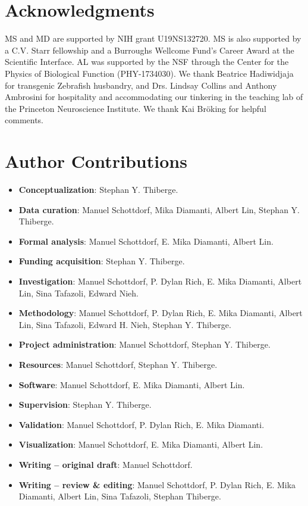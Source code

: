 \documentclass[10pt,letterpaper]{article}
\begin{document}
\section*{Acknowledgments}
MS and MD are supported by NIH grant U19NS132720. MS is also supported by a C.V. Starr fellowship and a Burroughs Wellcome Fund's Career Award at the Scientific Interface. AL was supported by the NSF through the Center for the Physics of Biological Function (PHY-1734030). We thank Beatrice Hadiwidjaja for transgenic Zebrafish husbandry, and Drs. Lindsay Collins and Anthony Ambrosini for hospitality and accommodating our tinkering in the teaching lab of the Princeton Neuroscience Institute. We thank Kai Br\"oking for helpful comments.

\section*{Author Contributions}
\begin{itemize}
    \item \textbf{Conceptualization}: Stephan Y. Thiberge.
    \item \textbf{Data curation}: Manuel Schottdorf, Mika Diamanti, Albert Lin, Stephan Y. Thiberge.
    \item \textbf{Formal analysis}: Manuel Schottdorf, E. Mika Diamanti, Albert Lin.
    \item \textbf{Funding acquisition}: Stephan Y. Thiberge.
    \item \textbf{Investigation}: Manuel Schottdorf, P. Dylan Rich, E. Mika Diamanti, Albert Lin, Sina Tafazoli, Edward Nieh.
    \item \textbf{Methodology}: Manuel Schottdorf, P. Dylan Rich, E. Mika Diamanti, Albert Lin, Sina Tafazoli, Edward H. Nieh, Stephan Y. Thiberge. 
    \item \textbf{Project administration}: Manuel Schottdorf, Stephan Y. Thiberge.
    \item \textbf{Resources}: Manuel Schottdorf, Stephan Y. Thiberge.
    \item \textbf{Software}: Manuel Schottdorf, E. Mika Diamanti, Albert Lin.
    \item \textbf{Supervision}: Stephan Y. Thiberge.
    \item \textbf{Validation}: Manuel Schottdorf, P. Dylan Rich, E. Mika Diamanti.
    \item \textbf{Visualization}: Manuel Schottdorf, E. Mika Diamanti, Albert Lin.
    \item \textbf{Writing – original draft}: Manuel Schottdorf.
    \item \textbf{Writing – review \& editing}: Manuel Schottdorf, P. Dylan Rich, E. Mika Diamanti, Albert Lin, Sina Tafazoli, Stephan Thiberge.
\end{itemize}
\end{document}
